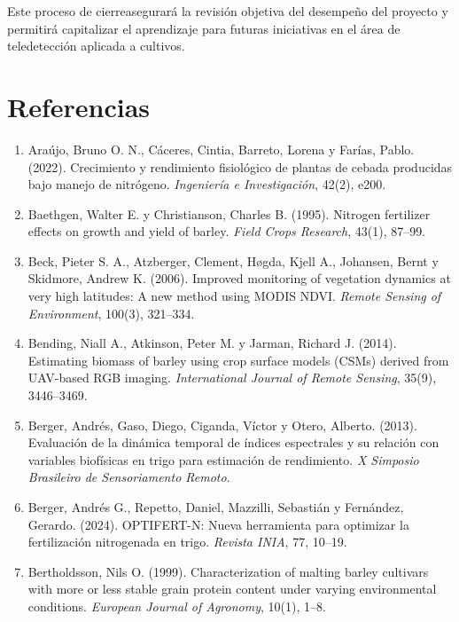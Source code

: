 \documentclass[
11pt, %
]{charter}
\begin{document}
Este proceso de cierreasegurará la revisión objetiva del desempeño del proyecto y permitirá capitalizar el aprendizaje para futuras iniciativas en el área de teledetección aplicada a cultivos.

\pagebreak

\section{Referencias}
\label{sec:cierre}

\begin{enumerate}
    \item Araújo, Bruno O. N., Cáceres, Cintia, Barreto, Lorena y Farías, Pablo. (2022). Crecimiento y rendimiento fisiológico de plantas de cebada producidas bajo manejo de nitrógeno. \emph{Ingeniería e Investigación}, 42(2), e200.

    \item Baethgen, Walter E. y Christianson, Charles B. (1995). Nitrogen fertilizer effects on growth and yield of barley. \emph{Field Crops Research}, 43(1), 87–99.

    \item Beck, Pieter S. A., Atzberger, Clement, Høgda, Kjell A., Johansen, Bernt y Skidmore, Andrew K. (2006). Improved monitoring of vegetation dynamics at very high latitudes: A new method using MODIS NDVI. \emph{Remote Sensing of Environment}, 100(3), 321–334.

    \item Bending, Niall A., Atkinson, Peter M. y Jarman, Richard J. (2014). Estimating biomass of barley using crop surface models (CSMs) derived from UAV-based RGB imaging. \emph{International Journal of Remote Sensing}, 35(9), 3446–3469.

    \item Berger, Andrés, Gaso, Diego, Ciganda, Víctor y Otero, Alberto. (2013). Evaluación de la dinámica temporal de índices espectrales y su relación con variables biofísicas en trigo para estimación de rendimiento. \emph{X Simposio Brasileiro de Sensoriamento Remoto}.

    \item Berger, Andrés G., Repetto, Daniel, Mazzilli, Sebastián y Fernández, Gerardo. (2024). OPTIFERT-N: Nueva herramienta para optimizar la fertilización nitrogenada en trigo. \emph{Revista INIA}, 77, 10–19.

    \item Bertholdsson, Nils O. (1999). Characterization of malting barley cultivars with more or less stable grain protein content under varying environmental conditions. \emph{European Journal of Agronomy}, 10(1), 1–8.


\end{enumerate}
\end{document}

